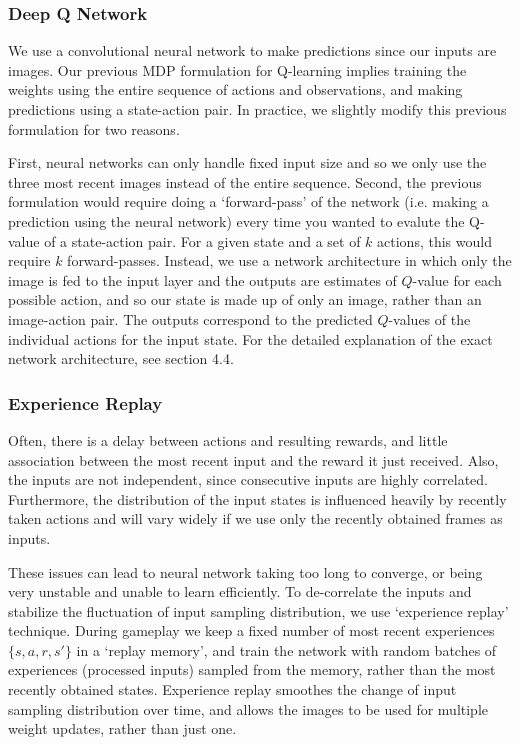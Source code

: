 \documentclass{article}
\begin{document}
\begin{multicols}{2}
\subsubsection{Deep Q Network}

We use a convolutional neural network to make predictions since our inputs are images. Our previous MDP formulation for Q-learning implies training the weights using the entire sequence of actions and observations, and making predictions using a state-action pair. In practice, we slightly modify this previous formulation for two reasons.

First, neural networks can only handle fixed input size and so we only use the three most recent images instead of the entire sequence.
Second, the previous formulation would require doing a `forward-pass' of the network (i.e. making a prediction using the neural network) every time you wanted to evalute the Q-value of a state-action pair. For a given state and a set of $k$ actions, this would require $k$ forward-passes.
Instead, we use a network architecture in which only the image is fed to the input layer and the outputs are estimates of $Q$-value for each possible action, and so our state is made up of only an image, rather than an image-action pair. The outputs correspond to the predicted $Q$-values of the individual actions for the input state. For the detailed explanation of the exact network architecture, see section 4.4.

\subsubsection{Experience Replay}

Often, there is a delay between actions and resulting rewards, and little association between the most recent input and the reward it just received. Also, the inputs are not independent, since consecutive inputs are highly correlated. Furthermore, the distribution of the input states is influenced heavily by recently taken actions and will vary widely if we use only the recently obtained frames as inputs.

These issues can lead to neural network taking too long to converge, or being very unstable and unable to learn efficiently. To de-correlate the inputs and stabilize the fluctuation of input sampling distribution, we use `experience replay' technique. During gameplay we keep a fixed number of most recent experiences $\{s, a, r, s'\}$ in a `replay memory', and train the network with random batches of experiences (processed inputs) sampled from the memory, rather than the most recently obtained states. Experience replay smoothes the change of input sampling distribution over time, and allows the images to be used for multiple weight updates, rather than just one.


\end{multicols}
\end{document}
